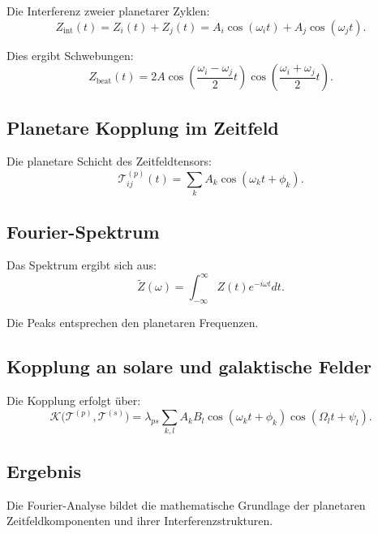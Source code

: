 Die Interferenz zweier planetarer Zyklen:
\[
Z_{\text{int}}(t) = Z_i(t) + Z_j(t)
= A_i \cos(\omega_i t) + A_j \cos(\omega_j t).
\]

Dies ergibt Schwebungen:
\[
Z_{\text{beat}}(t) = 2 A \cos\left(\frac{\omega_i - \omega_j}{2} t\right)
\cos\left(\frac{\omega_i + \omega_j}{2} t\right).
\]

\subsection{Planetare Kopplung im Zeitfeld}

Die planetare Schicht des Zeitfeldtensors:
\[
\mathcal{T}^{(p)}_{ij}(t) = \sum_k A_k \cos(\omega_k t + \phi_k).
\]

\subsection{Fourier-Spektrum}

Das Spektrum ergibt sich aus:
\[
\tilde{Z}(\omega) = \int_{-\infty}^{\infty} Z(t) e^{-i\omega t} dt.
\]

Die Peaks entsprechen den planetaren Frequenzen.

\subsection{Kopplung an solare und galaktische Felder}

Die Kopplung erfolgt über:
\[
\mathcal{K}\big(\mathcal{T}^{(p)}, \mathcal{T}^{(s)}\big)
= \lambda_{ps} \sum_{k,l} A_k B_l \cos(\omega_k t + \phi_k)
\cos(\Omega_l t + \psi_l).
\]

\subsection{Ergebnis}

Die Fourier-Analyse bildet die mathematische Grundlage der planetaren
Zeitfeldkomponenten und ihrer Interferenzstrukturen.
